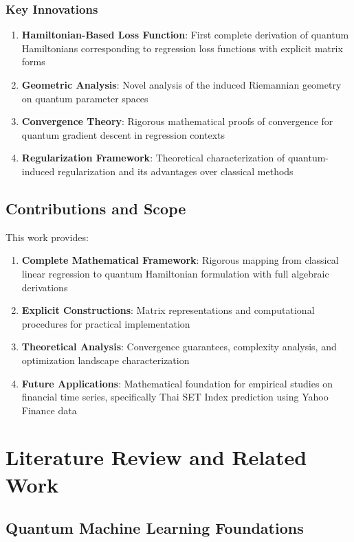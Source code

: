 \documentclass[11pt]{article}
\begin{document}
\subsubsection{Key Innovations}

\begin{enumerate}
\item \textbf{Hamiltonian-Based Loss Function}: First complete derivation of quantum Hamiltonians corresponding to regression loss functions with explicit matrix forms
\item \textbf{Geometric Analysis}: Novel analysis of the induced Riemannian geometry on quantum parameter spaces
\item \textbf{Convergence Theory}: Rigorous mathematical proofs of convergence for quantum gradient descent in regression contexts
\item \textbf{Regularization Framework}: Theoretical characterization of quantum-induced regularization and its advantages over classical methods
\end{enumerate}

\subsection{Contributions and Scope}

This work provides:
\begin{enumerate}
\item \textbf{Complete Mathematical Framework}: Rigorous mapping from classical linear regression to quantum Hamiltonian formulation with full algebraic derivations
\item \textbf{Explicit Constructions}: Matrix representations and computational procedures for practical implementation
\item \textbf{Theoretical Analysis}: Convergence guarantees, complexity analysis, and optimization landscape characterization
\item \textbf{Future Applications}: Mathematical foundation for empirical studies on financial time series, specifically Thai SET Index prediction using Yahoo Finance data
\end{enumerate}

\section{Literature Review and Related Work}

\subsection{Quantum Machine Learning Foundations}
\end{document}
